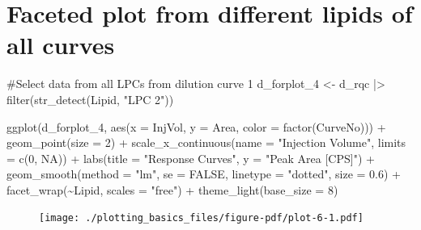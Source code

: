 \documentclass[
  letterpaper,
  DIV=11,
  numbers=noendperiod]{scrreprt}
\newenvironment{Shaded}{\begin{snugshade}}{\end{snugshade}}
\newcommand{\AttributeTok}[1]{\textcolor[rgb]{0.40,0.45,0.13}{#1}}
\newcommand{\CommentTok}[1]{\textcolor[rgb]{0.37,0.37,0.37}{#1}}
\newcommand{\ConstantTok}[1]{\textcolor[rgb]{0.56,0.35,0.01}{#1}}
\newcommand{\DecValTok}[1]{\textcolor[rgb]{0.68,0.00,0.00}{#1}}
\newcommand{\FloatTok}[1]{\textcolor[rgb]{0.68,0.00,0.00}{#1}}
\newcommand{\FunctionTok}[1]{\textcolor[rgb]{0.28,0.35,0.67}{#1}}
\newcommand{\NormalTok}[1]{\textcolor[rgb]{0.00,0.23,0.31}{#1}}
\newcommand{\OtherTok}[1]{\textcolor[rgb]{0.00,0.23,0.31}{#1}}
\newcommand{\SpecialCharTok}[1]{\textcolor[rgb]{0.37,0.37,0.37}{#1}}
\newcommand{\StringTok}[1]{\textcolor[rgb]{0.13,0.47,0.30}{#1}}
\begin{document}
\hypertarget{faceted-plot-from-different-lipids-of-all-curves}{%
\section{Faceted plot from different lipids of all
curves}\label{faceted-plot-from-different-lipids-of-all-curves}}

\begin{Shaded}
\begin{Highlighting}[]
\CommentTok{\#Select data from all LPCs from  dilution curve 1}
\NormalTok{d\_forplot\_4 }\OtherTok{\textless{}{-}}\NormalTok{ d\_rqc  }\SpecialCharTok{|\textgreater{}} \FunctionTok{filter}\NormalTok{(}\FunctionTok{str\_detect}\NormalTok{(Lipid, }\StringTok{"LPC 2"}\NormalTok{))}

\FunctionTok{ggplot}\NormalTok{(d\_forplot\_4, }\FunctionTok{aes}\NormalTok{(}\AttributeTok{x =}\NormalTok{ InjVol, }\AttributeTok{y =}\NormalTok{ Area, }
                        \AttributeTok{color =} \FunctionTok{factor}\NormalTok{(CurveNo))) }\SpecialCharTok{+} 
  \FunctionTok{geom\_point}\NormalTok{(}\AttributeTok{size =} \DecValTok{2}\NormalTok{) }\SpecialCharTok{+}
  \FunctionTok{scale\_x\_continuous}\NormalTok{(}\AttributeTok{name =} \StringTok{"Injection Volume"}\NormalTok{, }\AttributeTok{limits =} \FunctionTok{c}\NormalTok{(}\DecValTok{0}\NormalTok{, }\ConstantTok{NA}\NormalTok{)) }\SpecialCharTok{+} 
  \FunctionTok{labs}\NormalTok{(}\AttributeTok{title =} \StringTok{"Response Curves"}\NormalTok{, }\AttributeTok{y =} \StringTok{"Peak Area [CPS]"}\NormalTok{) }\SpecialCharTok{+}
  \FunctionTok{geom\_smooth}\NormalTok{(}\AttributeTok{method =} \StringTok{"lm"}\NormalTok{, }\AttributeTok{se =} \ConstantTok{FALSE}\NormalTok{, }
              \AttributeTok{linetype =} \StringTok{"dotted"}\NormalTok{, }\AttributeTok{size =} \FloatTok{0.6}\NormalTok{) }\SpecialCharTok{+}
  \FunctionTok{facet\_wrap}\NormalTok{(}\SpecialCharTok{\textasciitilde{}}\NormalTok{Lipid, }\AttributeTok{scales =} \StringTok{"free"}\NormalTok{) }\SpecialCharTok{+}
  \FunctionTok{theme\_light}\NormalTok{(}\AttributeTok{base\_size =} \DecValTok{8}\NormalTok{)}
\end{Highlighting}
\end{Shaded}

\begin{figure}[H]

{\centering \texttt{[image: ./plotting\_basics\_files/figure-pdf/plot-6-1.pdf]}

}

\end{figure}
\end{document}
